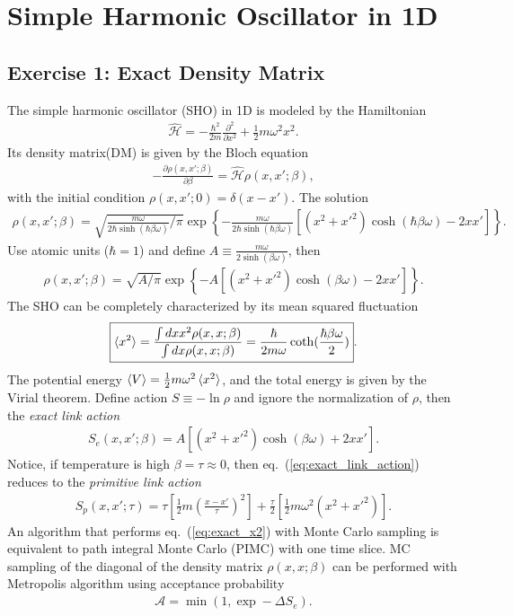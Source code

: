 \documentclass[aps,prl,preprint]{revtex4-1}
\begin{document}
\section{Simple Harmonic Oscillator in 1D}

\subsection{Exercise 1: Exact Density Matrix}
The simple harmonic oscillator (SHO) in 1D is modeled by the Hamiltonian
\begin{align}
\hat{\mathcal{H}} = -\frac{\hbar^2}{2m}\frac{\partial^2}{\partial x^2} + \frac{1}{2}m\omega^2x^2.
\end{align}
Its density matrix(DM) is given by the Bloch equation
\begin{align}
-\frac{\partial \rho(x,x';\beta)}{\partial \beta} = \hat{\mathcal{H}}\rho(x,x';\beta),
\end{align}
with the initial condition $\rho(x,x';0)=\delta(x-x')$. The solution 
\begin{align}
\rho(x,x';\beta) = \sqrt{\frac{m\omega}{2\hbar\sinh(\hbar\beta\omega)}/\pi}
\exp\left\{ -\frac{m\omega}{2\hbar\sinh(\hbar\beta\omega)} \left[ (x^2+x'^2)\cosh(\hbar\beta\omega)-2xx' \right] \right\}.
\end{align}
Use atomic units ($\hbar=1$) and define $A\equiv\frac{m\omega}{2\sinh(\beta\omega)}$, then
\begin{align}
\rho(x,x';\beta) = \sqrt{A/\pi}
\exp\left\{ -A \left[ (x^2+x'^2)\cosh(\beta\omega)-2xx' \right] \right\}. \label{eq:exact_dm}
\end{align}
The SHO can be completely characterized by its mean squared fluctuation
\begin{align}
\boxed{\braket{x^2} =\frac{\int dx x^2 \rho(x,x;\beta)}{\int dx \rho(x,x;\beta)} = \frac{\hbar}{2m\omega}\coth(\frac{\hbar\beta\omega}{2})}. \label{eq:exact_x2}
\end{align}
The potential energy $\braket{V}=\frac{1}{2}m\omega^2\braket{x^2}$, and the total energy is given by the Virial theorem. Define action $S\equiv-\ln\rho$ and ignore the normalization of $\rho$, then the \emph{exact link action}
\begin{align} 
S_e(x,x';\beta) = A\left[(x^2+x'^2)\cosh(\beta\omega)+2xx'\right].\label{eq:exact_link_action}
\end{align}
Notice, if temperature is high $\beta=\tau\approx0$, then eq.~(\ref{eq:exact_link_action}) reduces to the \emph{primitive link action}
\begin{align} 
S_p(x,x';\tau) = \tau \left[\frac{1}{2} m\left(\frac{x-x'}{\tau}\right)^2\right] +\frac{\tau}{2}\left[\frac{1}{2}m\omega^2(x^2+x'^2) \right].
\end{align}
An algorithm that performs eq.~(\ref{eq:exact_x2}) with Monte Carlo sampling is equivalent to path integral Monte Carlo (PIMC) with one time slice. MC sampling of the diagonal of the density matrix $\rho(x,x;\beta)$ can be performed with Metropolis algorithm using acceptance probability
\begin{align}
\mathcal{A} = \min\left(1,\exp -\Delta S_e \right).
\end{align}
\end{document}
